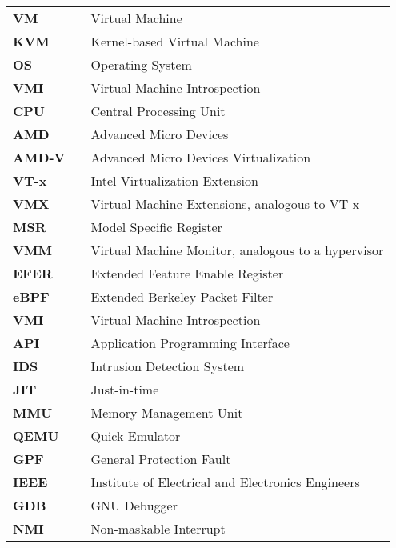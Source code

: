 \documentclass{report}
\begin{document}
\begin{spacing}{1.5}
\begin{tabular}{lcl}
\large{\bf VM}  & & \large{Virtual Machine} \\
\large{\bf KVM}  & & \large{Kernel-based Virtual Machine} \\
\large{\bf OS}   & & \large{Operating System}        \\
\large{\bf VMI}  & & \large{Virtual Machine Introspection} \\
\large{\bf CPU}  & & \large{Central Processing Unit} \\
\large{\bf AMD}  & & \large{Advanced Micro Devices} \\
\large{\bf AMD-V}  & & \large{Advanced Micro Devices Virtualization} \\
\large{\bf VT-x}  & & \large{Intel Virtualization Extension} \\
\large{\bf VMX}  & & \large{Virtual Machine Extensions, analogous to VT-x} \\
\large{\bf MSR}  & & \large{Model Specific Register} \\
\large{\bf VMM}  & & \large{Virtual Machine Monitor, analogous to a hypervisor} \\
\large{\bf EFER}  & & \large{Extended Feature Enable Register} \\
\large{\bf eBPF}  & & \large{Extended Berkeley Packet Filter} \\
\large{\bf VMI}  & & \large{Virtual Machine Introspection} \\
\large{\bf API}  & & \large{Application Programming Interface} \\
\large{\bf IDS}  & & \large{Intrusion Detection System} \\
\large{\bf JIT}  & & \large{Just-in-time} \\
\large{\bf MMU}  & & \large{Memory Management Unit} \\
\large{\bf QEMU}  & & \large{Quick Emulator} \\
\large{\bf GPF}  & & \large{General Protection Fault} \\
\large{\bf IEEE}  & & \large{Institute of Electrical and Electronics Engineers} \\
\large{\bf GDB}  & & \large{GNU Debugger} \\
\large{\bf NMI}  & & \large{Non-maskable Interrupt} \\
\end{tabular}















\end{spacing}
\end{document}

